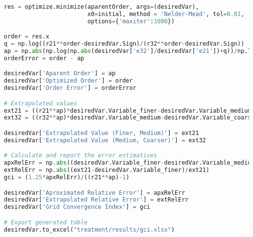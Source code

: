 \begin{lstlisting}[language=python]
res = optimize.minimize(aparentOrder, args=(desiredVar),
                        x0=initial, method = 'Nelder-Mead', tol=0.01,
                        options={'maxiter':1000})

order = res.x
q = np.log((r21**order-desiredVar.Sign)/(r32**order-desiredVar.Sign))
ap = np.abs(np.log(np.abs(desiredVar['e32']/desiredVar['e21'])+q))/np.log(r21)
orderError = order - ap

desiredVar['Aparent Order'] = ap
desiredVar['Optimized Order'] = order
desiredVar['Order Error'] = orderError

# Extrapolated values
ext21 = ((r21**ap)*desiredVar.Variable_finer-desiredVar.Variable_medium)/((r21**ap)-1)
ext32 = ((r32**ap)*desiredVar.Variable_medium-desiredVar.Variable_coarser)/((r32**ap)-1)

desiredVar['Extrapolated Value (Finer, Medium)'] = ext21
desiredVar['Extrapolated Value (Medium, Coarser)'] = ext32

# Calculate and report the error estimatives
apxRelErr = np.abs((desiredVar.Variable_finer-desiredVar.Variable_medium)/desiredVar.Variable_finer)
extRelErr = np.abs((ext21-desiredVar.Variable_finer)/ext21)
gci = (1.25*apxRelErr)/((r21**ap)-1)

desiredVar['Aproximated Relative Error'] = apxRelErr
desiredVar['Extrapolated Relative Error'] = extRelErr
desiredVar['Grid Convergence Index'] = gci

# Export generated table
desiredVar.to_excel("treatment/results/gci.xlsx")   

\end{lstlisting}

